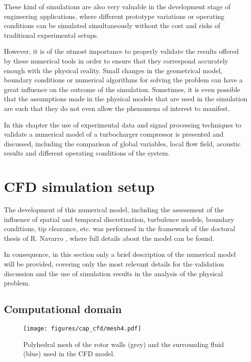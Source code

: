 These kind of simulations are also very valuable in the development stage of engineering applications, where different prototype variations or operating conditions can be simulated simultaneously without the cost and risks of traditional experimental setups. 

However, it is of the utmost importance to properly validate the results offered by these numerical tools in order to ensure that they correspond accurately enough with the physical reality. Small changes in the geometrical model, boundary conditions or numerical algorithms for solving the problem can have a great influence on the outcome of the simulation. Sometimes, it is even possible that the assumptions made in the physical models that are used in the simulation are such that they do not even allow the phenomena of interest to manifest.

In this chapter the use of experimental data and signal processing techniques to validate a numerical model of a turbocharger compressor is presented and discussed, including the comparison of global variables, local flow field, acoustic results and different operating conditions of the system. 

\section{CFD simulation setup}

The development of this numerical model, including the assessment of the influence of spatial and temporal discretization, turbulence models, boundary conditions, tip clearance, etc. was performed in the framework of the doctoral thesis of R. Navarro \cite{navarro2014numerical}, where full details about the model can be found.

In consequence, in this section only a brief description of the numerical model will be provided, covering only the most relevant details for the validation discussion and the use of simulation results in the analysis of the physical problem.

\subsection{Computational domain}

\begin{wrapfigure}[16]{I}[0cm]{0.4\textwidth}
\raggedleft
\vspace{-4mm}
\texttt{[image: figures/cap\_cfd/mesh4.pdf]}
\caption{Polyhedral mesh of the rotor walls (grey) and the surrounding fluid (blue) used in the CFD model.}
\label{fig:cfd_mesh}
\end{wrapfigure}

